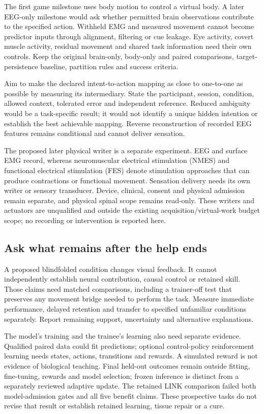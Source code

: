 The first game milestone uses body motion to control a virtual body. A later
EEG-only milestone would ask whether permitted brain observations contribute to
the specified action. Withheld EMG and measured movement cannot become predictor
inputs through alignment, filtering or cue leakage. Eye activity, covert muscle
activity, residual movement and shared task information need their own controls.
Keep the original brain-only, body-only and paired comparisons, target-persistence
baseline, partition rules and success criteria.

Aim to make the declared intent-to-action mapping as close to one-to-one as
possible by measuring its intermediary. State the participant, session, condition,
allowed context, tolerated error and independent reference. Reduced ambiguity
would be a task-specific result; it would not identify a unique hidden intention
or establish the best achievable mapping. Reverse reconstruction of recorded
EEG features remains conditional and cannot deliver sensation.

The proposed later physical writer is a separate experiment. EEG and surface
EMG record, whereas neuromuscular electrical stimulation (NMES) and functional electrical stimulation (FES) denote stimulation approaches that can produce
contractions or functional movement. Sensation delivery needs its own writer or
sensory transducer. Device, clinical, consent and physical admission remain
separate, and physical spinal scope remains read-only. These writers and
actuators are unqualified and outside the existing acquisition/virtual-work
budget scope; no recording or intervention is reported here.

\subsection{Ask what remains after the help ends}

A proposed blindfolded condition changes visual feedback. It cannot independently
establish neural contribution, causal control or retained skill. Those claims
need matched comparisons, including a trainer-off test that preserves any movement
bridge needed to perform the task. Measure immediate performance, delayed
retention and transfer to specified unfamiliar conditions separately. Report
remaining support, uncertainty and alternative explanations.

The model's training and the trainee's learning also need separate evidence.
Qualified paired data could fit predictions; optional control-policy reinforcement
learning needs states, actions, transitions and rewards. A simulated reward is
not evidence of biological teaching. Final held-out outcomes remain outside
fitting, fine-tuning, rewards and model selection; frozen inference is distinct
from a separately reviewed adaptive update. The retained LINK comparison failed
both model-admission gates and all five benefit claims. These prospective tasks
do not revise that result or establish retained learning, tissue repair or a cure.
